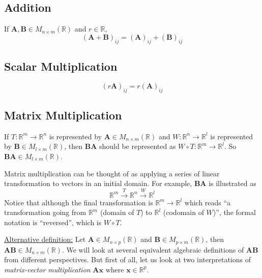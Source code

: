 \subsection{Addition} If $\bm{A},\bm{B}\in M_{n\times m}(\mathbb{R})$ and $r\in\mathbb{R}$,
\begin{equation}
(\bm{A}+\bm{B})_{ij}=(\bm{A})_{ij}+(\bm{B})_{ij}
\end{equation}

\subsection{Scalar Multiplication}
\begin{equation}
(r\bm{A})_{ij} = r(\bm{A})_{ij}
\end{equation}

\subsection{Matrix Multiplication} 
If $T:\mathbb{R}^m\rightarrow\mathbb{R}^n$ is represented by $\bm{A}\in M_{n\times m}(\mathbb{R})$ and $W:\mathbb{R}^n\rightarrow\mathbb{R}^l$ is represented by $\bm{B}\in M_{l\times m}(\mathbb{R})$, then $\bm{BA}$ should be represented as $W\circ T: \mathbb{R}^m\rightarrow\mathbb{R}^l$. So $\bm{BA}\in M_{l\times m}(\mathbb{R})$.

Matrix multiplication can be thought of as applying a series of linear transformation to vectors in an initial domain. For example, $\bm{BA}$ is illustrated as
\[
\mathbb{R}^m\xrightarrow{T}\mathbb{R}^n\xrightarrow{W}\mathbb{R}^l
\]
Notice that although the final transformation is $\mathbb{R}^m\rightarrow\mathbb{R}^l$ which reads ``a transformation going from $\mathbb{R}^m$ (domain of $T$) to $\mathbb{R}^l$ (codomain of $W$)'', the formal notation is ``reversed'', which is $W\circ T$.

\underline{Alternative definition:}
Let $\bm{A}\in M_{n\times p}(\mathbb{R})$ and $\bm{B}\in M_{p\times m}(\mathbb{R})$, then $\bm{A}\bm{B}\in M_{n\times m}(\mathbb{R})$. We will look at several equivalent algebraic definitions of $\bm{AB}$ from different perspectives. But first of all, let us look at two interpretations of \emph{matrix-vector multiplication} $\bm{Ax}$ where $\bm{x}\in\mathbb{R}^p$.

